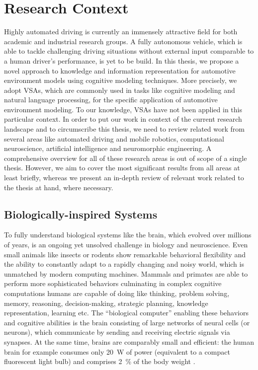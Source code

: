 \chapter{Research Context}%
\label{chap:research_context}

Highly automated driving is currently an immensely attractive field for both academic and industrial research groups.
A fully autonomous vehicle, which is able to tackle challenging driving situations without external input comparable to a human driver's performance, is yet to be build.
In this thesis, we propose a novel approach to knowledge and information representation for automotive environment models using cognitive modeling techniques.
More precisely, we adopt \acfp{VSA}, which are commonly used in tasks like cognitive modeling and natural language processing, for the specific application of automotive environment modeling.
To our knowledge, \acp{VSA} have not been applied in this particular context.
In order to put our work in context of the current research landscape and to circumscribe this thesis, we need to review related work from several areas like automated driving and mobile robotics, computational neuroscience, artificial intelligence and neuromorphic engineering.
A comprehensive overview for all of these research areas is out of scope of a single thesis.
However, we aim to cover the most significant results from all areas at least briefly, whereas we present an in-depth review of relevant work related to the thesis at hand, where necessary.

\section{Biologically-inspired Systems}
\label{sec:bio_systems}

To fully understand biological systems like the brain, which evolved over millions of years, is an ongoing yet unsolved challenge in biology and neuroscience.
Even small animals like insects or rodents show remarkable behavioral flexibility and the ability to constantly adapt to a rapidly changing and noisy world, which is unmatched by modern computing machines.
Mammals and primates are able to perform more sophisticated behaviors culminating in complex cognitive computations humans are capable of doing like thinking, problem solving, memory, reasoning, decision-making, strategic planning, knowledge representation, learning etc.
The \enquote{biological computer} enabling these behaviors and cognitive abilities is the brain consisting of large networks of neural cells (or neurons), which communicate by sending and receiving electric signals via synapses.
At the same time, brains are comparably small and efficient: the human brain for example consumes only \SI{20}{\watt} of power (equivalent to a compact fluorescent light bulb) and comprises \SI{2}{\percent} of the body weight \parencite[Chap. 2.1]{Eliasmith2013}. 


